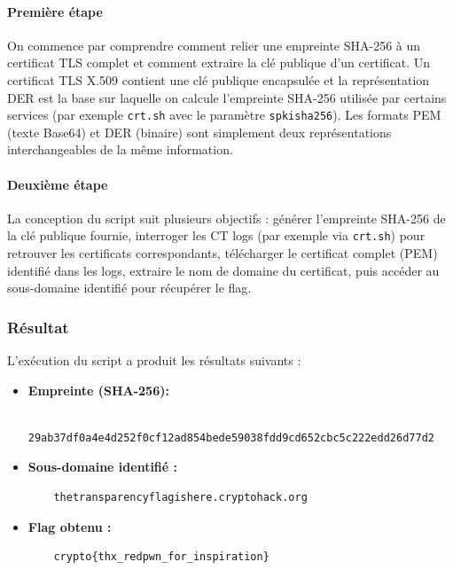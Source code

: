 \paragraph{Première étape} On commence par comprendre comment relier une empreinte SHA-256 à un certificat TLS complet et comment extraire la clé publique d'un certificat. Un certificat TLS X.509 contient une clé publique encapsulée et la représentation DER est la base sur laquelle on calcule l'empreinte SHA-256 utilisée par certains services (par exemple \texttt{crt.sh} avec le paramètre \texttt{spkisha256}). Les formats PEM (texte Base64) et DER (binaire) sont simplement deux représentations interchangeables de la même information.


\paragraph{Deuxième étape} La conception du script suit plusieurs objectifs : générer l'empreinte SHA-256 de la clé publique fournie, interroger les CT logs (par exemple via \texttt{crt.sh}) pour retrouver les certificats correspondants, télécharger le certificat complet (PEM) identifié dans les logs, extraire le nom de domaine du certificat, puis accéder au sous-domaine identifié pour récupérer le flag.


\subsubsection{Résultat}
L'exécution du script a produit les résultats suivants :
\begin{itemize}
    \item \textbf{Empreinte (SHA-256):}
    \begin{verbatim}
    29ab37df0a4e4d252f0cf12ad854bede59038fdd9cd652cbc5c222edd26d77d2
    \end{verbatim}
    \item \textbf{Sous-domaine identifié :}
    \begin{verbatim}
    thetransparencyflagishere.cryptohack.org
    \end{verbatim}
    \item \textbf{Flag obtenu :}
    \begin{verbatim}
    crypto{thx_redpwn_for_inspiration}
    \end{verbatim}
\end{itemize}
